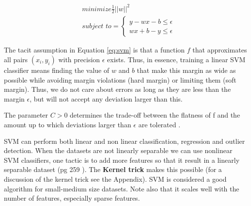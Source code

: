 \documentclass[11pt]{article}
\theoremstyle{definition}
\theoremstyle{remark}
\begin{document}
{%

\begin{equation}\label{eq:svm}
\begin{aligned}
 & \textit{minimize} \frac{1}{2} ||w||^2 \\
 & \textit{subject to}=
 \begin{cases}
    y - wx -b \leq \epsilon \\
    wx +b - y \leq \epsilon
  \end{cases}
  \end{aligned}
\end{equation}

The tacit assumption in Equation \ref{eq:svm} is that a function $f$ that approximates all pairs $(x_i, y_i)$ with precision $\epsilon$ exists.
Thus, in essence, training a linear SVM classifier means finding the value of $w$ and $b$ that make this margin as wide as possible while avoiding margin violations (hard margin) or limiting them (soft margin). Thus, we do not care about errors as long as they are less than the margin $\epsilon$, but will not
accept any deviation larger than this. 

The parameter $C > 0$ determines the trade-off between the flatness of f and the amount up to which deviations larger than $\epsilon$ are tolerated \cite{smola2004tutorial}. 



SVM can perform both linear and non linear classification, regression and outlier detection. When the datasets are not linearly separable we can use nonlinear SVM classifiers, one tactic is to add more features so that it result in a linearly separable dataset (pg 259 \cite{geron2017hands}). The \textbf{Kernel trick} makes this possible (for a discussion of the kernel trick see the Appendix). SVM is considered a good algorithm for small-medium size datasets. Note also that it scales well with the number of features, especially sparse features. 

}
\end{document}
